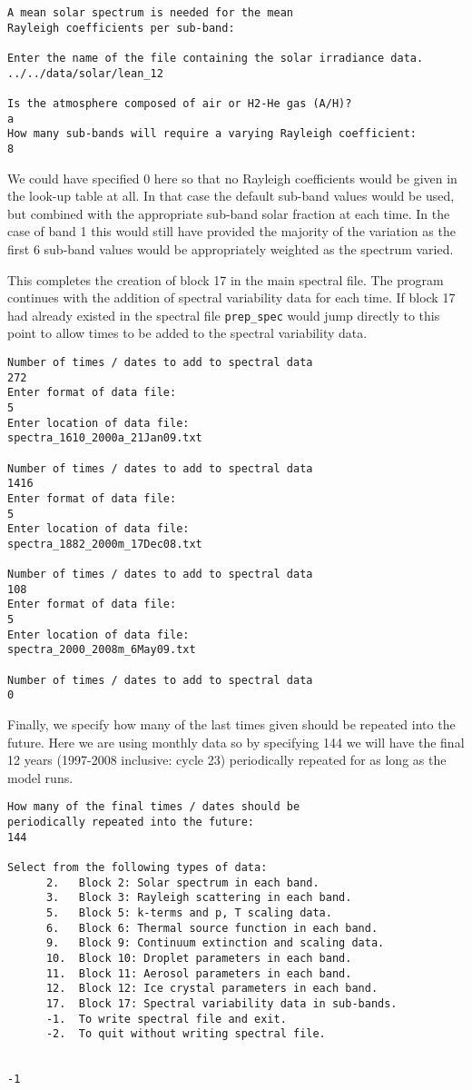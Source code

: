 {\small
\begin{verbatim}
A mean solar spectrum is needed for the mean
Rayleigh coefficients per sub-band:

Enter the name of the file containing the solar irradiance data.
../../data/solar/lean_12

Is the atmosphere composed of air or H2-He gas (A/H)?
a
How many sub-bands will require a varying Rayleigh coefficient:
8
\end{verbatim}
}

\noindent We could have specified 0 here so that no Rayleigh coefficients would be given in the look-up table at all. In that case the default sub-band values would be used, but combined with the appropriate sub-band solar fraction at each time. In the case of band 1 this would still have provided the majority of the variation as the first 6 sub-band values would be appropriately weighted as the spectrum varied.

This completes the creation of block 17 in the main spectral file. The program continues with the addition of spectral variability data for each time. If block 17 had already existed in the spectral file {\tt prep\_spec} would jump directly to this point to allow times to be added to the spectral variability data.

{\small
\begin{verbatim}
Number of times / dates to add to spectral data
272
Enter format of data file:
5
Enter location of data file:
spectra_1610_2000a_21Jan09.txt

Number of times / dates to add to spectral data
1416
Enter format of data file:
5
Enter location of data file:
spectra_1882_2000m_17Dec08.txt

Number of times / dates to add to spectral data
108
Enter format of data file:
5
Enter location of data file:
spectra_2000_2008m_6May09.txt

Number of times / dates to add to spectral data
0
\end{verbatim}
}

\noindent Finally, we specify how many of the last times given should be repeated into the future. Here we are using monthly data so by specifying 144 we will have the final 12 years (1997-2008 inclusive: cycle 23) periodically repeated for as long as the model runs.

{\small
\begin{verbatim}
How many of the final times / dates should be 
periodically repeated into the future:
144

Select from the following types of data:
      2.   Block 2: Solar spectrum in each band.
      3.   Block 3: Rayleigh scattering in each band.
      5.   Block 5: k-terms and p, T scaling data.
      6.   Block 6: Thermal source function in each band.
      9.   Block 9: Continuum extinction and scaling data.
      10.  Block 10: Droplet parameters in each band.
      11.  Block 11: Aerosol parameters in each band.
      12.  Block 12: Ice crystal parameters in each band.
      17.  Block 17: Spectral variability data in sub-bands.
      -1.  To write spectral file and exit.
      -2.  To quit without writing spectral file.


-1
\end{verbatim}
}

